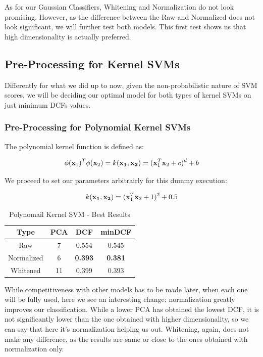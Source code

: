 \documentclass[12pt, twocolumn]{article}
\begin{document}
As for our Gaussian Classifiers, Whitening and Normalization do not look promising. 
However, as the difference between the Raw and Normalized does not look significant,
we will further test both models.
This first test shows us that high dimensionality is actually preferred.

\subsection{Pre-Processing for Kernel SVMs}

Differently for what we did up to now, given the non-probabilistic nature of SVM scores,
we will be deciding our optimal model for both types of kernel SVMs on just minimum DCFs values.

\subsubsection{Pre-Processing for Polynomial Kernel SVMs}

The polynomial kernel function is defined as:

$$ \phi({\bf x}_1)^T\phi({\bf x}_2) = k({\bf x_1}, {\bf x_2}) = ({\bf x}_1^T{\bf x}_2 + c)^d + b $$

We proceed to set our parameters arbitrairly for this dummy execution:

$$k({\bf x_1}, {\bf x_2}) = ({\bf x}_1^T{\bf x}_2+1)^2+0.5 $$

\begin{table}[H]
    \centering
        \begin{tabular}{||c|c|c|c||}
            \hline
            Type & PCA & DCF & minDCF \\
            \hline
            \hline
            Raw & 7 & 0.554 &  0.545  \\
            Normalized & 6 & {\bf 0.393} &  {\bf 0.381}  \\
            Whitened & 11 & 0.399 &  0.393  \\
            \hline
        \end{tabular}
        \caption{Polynomail Kernel SVM - Best Results}
        \label{polypreprocessing}
\end{table}

While competitiveness with other models has to be made later, when each one will be fully used, here we see an interesting change:
normalization greatly improves our classification.
While a lower PCA has obtained the lowest DCF, it is not significantly lower than the one obtained with higher dimensionality, so we can say that here it's normalization helping us out.
Whitening, again, does not make any difference, as the results are same or close to the ones obtained with normalization only.
\end{document}
